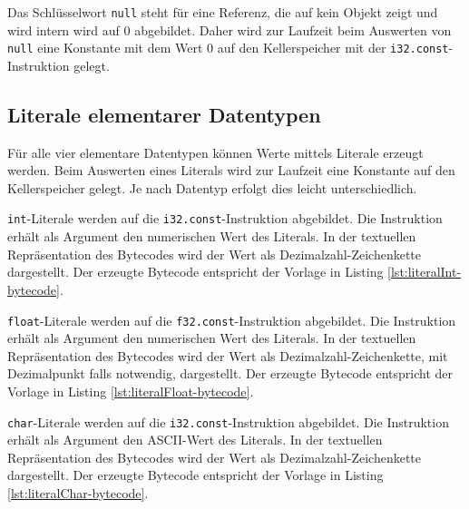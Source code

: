Das Schlüsselwort \lstinline{null} steht für eine Referenz, die auf kein Objekt zeigt und wird intern wird auf $0$ abgebildet. Daher wird zur Laufzeit beim Auswerten von \lstinline{null} eine Konstante mit dem Wert $0$ auf den Kellerspeicher mit der \lstinline{i32.const}-Instruktion gelegt.



\subsection{Literale elementarer Datentypen}

Für alle vier elementare Datentypen können Werte mittels Literale erzeugt werden. Beim Auswerten eines Literals wird zur Laufzeit eine Konstante auf den Kellerspeicher gelegt. Je nach Datentyp erfolgt dies leicht unterschiedlich.

\lstinline{int}-Literale werden auf die \lstinline{i32.const}-Instruktion abgebildet. Die Instruktion erhält als Argument den numerischen Wert des Literals. In der textuellen Repräsentation des Bytecodes wird der Wert als Dezimalzahl-Zeichenkette dargestellt. Der erzeugte Bytecode entspricht der Vorlage in Listing \ref{lst:literalInt-bytecode}.



\lstinline{float}-Literale werden auf die \lstinline{f32.const}-Instruktion abgebildet. Die Instruktion erhält als Argument den numerischen Wert des Literals. In der textuellen Repräsentation des Bytecodes wird der Wert als Dezimalzahl-Zeichenkette, mit Dezimalpunkt falls notwendig, dargestellt. Der erzeugte Bytecode entspricht der Vorlage in Listing \ref{lst:literalFloat-bytecode}.



\lstinline{char}-Literale werden auf die \lstinline{i32.const}-Instruktion abgebildet. Die Instruktion erhält als Argument den ASCII-Wert des Literals. In der textuellen Repräsentation des Bytecodes wird der Wert als Dezimalzahl-Zeichenkette dargestellt. Der erzeugte Bytecode entspricht der Vorlage in Listing \ref{lst:literalChar-bytecode}.

